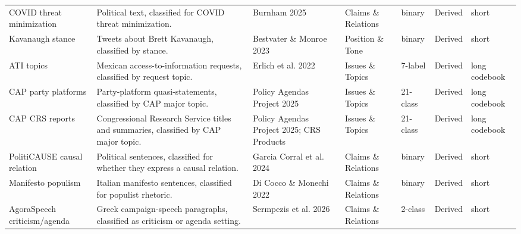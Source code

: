 \begin{longtable}[t]{l>{\raggedright\arraybackslash}p{18em}>{\raggedright\arraybackslash}p{7em}>{\raggedright\arraybackslash}p{8em}lll}
COVID threat minimization & Political text, classified for COVID threat minimization. & Burnham 2025 & Claims \& Relations & binary & Derived & short\\
Kavanaugh stance & Tweets about Brett Kavanaugh, classified by stance. & Bestvater \& Monroe 2023 & Position \& Tone & binary & Derived & short\\
ATI topics & Mexican access-to-information requests, classified by request topic. & Erlich et al. 2022 & Issues \& Topics & 7-label & Derived & long codebook\\
CAP party platforms & Party-platform quasi-statements, classified by CAP major topic. & Policy Agendas Project 2025 & Issues \& Topics & 21-class & Derived & long codebook\\
\addlinespace
CAP CRS reports & Congressional Research Service titles and summaries, classified by CAP major topic. & Policy Agendas Project 2025; CRS Products & Issues \& Topics & 21-class & Derived & long codebook\\
PolitiCAUSE causal relation & Political sentences, classified for whether they express a causal relation. & Garcia Corral et al. 2024 & Claims \& Relations & binary & Derived & short\\
Manifesto populism & Italian manifesto sentences, classified for populist rhetoric. & Di Cocco \& Monechi 2022 & Claims \& Relations & binary & Derived & short\\
AgoraSpeech criticism/agenda & Greek campaign-speech paragraphs, classified as criticism or agenda setting. & Sermpezis et al. 2026 & Claims \& Relations & 2-class & Derived & short\\*
\end{longtable}
\endgroup{}
